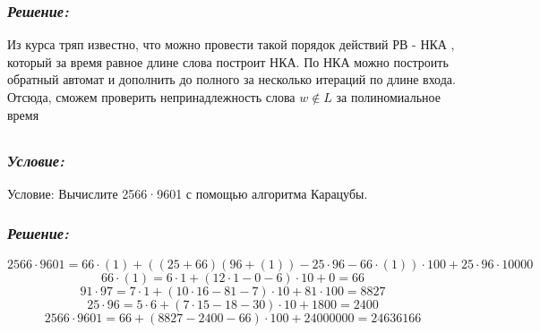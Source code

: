 \documentclass[a4paper, 11pt]{article} %
\newcommand*\circled[1]{\tikz[baseline=(char.base)]{
            \node[shape=circle,draw,inner sep=2pt] (char) {#1};}}
\begin{document}
\subsubsection*{\textit{Решение:}}
 Из курса тряп известно, что можно провести такой порядок действий 
 РВ - НКА , который за время равное длине слова построит НКА. По НКА можно построить обратный автомат и дополнить до полного за несколько итераций по длине входа. Отсюда, сможем проверить непринадлежность слова $w \notin L$ за полиномиальное время


\subsection*{\circled{6}} 
\subsubsection*{\textit{Условие:}}	
{Условие:} Вычислите 2566·9601 с помощью алгоритма Карацубы.
\subsubsection*{\textit{Решение:}}
\[2566\cdot9601 = 66\cdot(1)+((25+66)(96+(1))-25\cdot96-66\cdot(1))\cdot100+25\cdot96\cdot10000\]
\[66\cdot(1) = 6\cdot1+(12\cdot1-0-6)\cdot10+0 = 66\]
\[91\cdot97 = 7\cdot1 + (10\cdot16-81-7)\cdot10+81\cdot100 = 8827\]
\[25\cdot96 = 5\cdot6 + (7\cdot15-18-30)\cdot10 + 1800 = 2400\]
\[2566\cdot9601 = 66+(8827-2400-66)\cdot100+24000000 = 24636166\]
\end{document}
